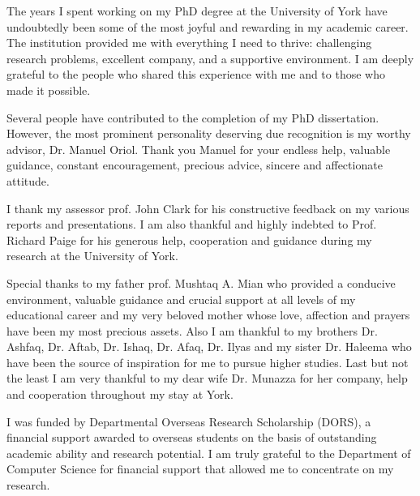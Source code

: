\begin{acknowledgements}
The years I spent working on my PhD degree at the University of York have undoubtedly been some of the most joyful and rewarding in my academic career. The institution provided me with everything I need to thrive: challenging research problems, excellent company, and a supportive environment. I am deeply grateful to the people who shared this experience with me and to those who made it possible. 

Several people have contributed to the completion of my PhD dissertation. However, the most prominent personality deserving due recognition is my worthy advisor, Dr. Manuel Oriol. Thank you Manuel for your endless help, valuable guidance, constant encouragement, precious advice, sincere and affectionate attitude.

I thank my assessor prof. John Clark for his constructive feedback on my various reports and presentations. I am also thankful and highly indebted to Prof. Richard Paige for his generous help, cooperation and guidance during my research at the University of York.

Special thanks to my father prof. Mushtaq A. Mian who provided a conducive environment, valuable guidance and crucial support at all levels of my educational career and my very beloved mother whose love, affection and prayers have been my most precious assets. Also I am thankful to my brothers Dr. Ashfaq, Dr. Aftab, Dr. Ishaq, Dr. Afaq, Dr. Ilyas and my sister Dr. Haleema who have been the source of inspiration for me to pursue higher studies. Last but not the least I am very thankful to my dear wife Dr. Munazza for her company, help and cooperation throughout my stay at York.

I was funded by Departmental Overseas Research Scholarship (DORS), a financial support awarded to overseas students on the basis of outstanding academic ability and research potential. I am truly grateful to the Department of Computer Science for financial support that allowed me to concentrate on my research.

\end{acknowledgements}